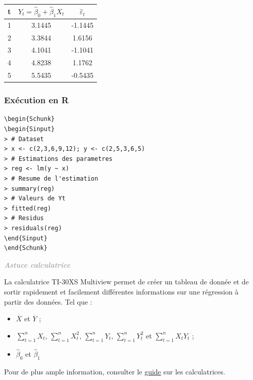 \documentclass[11pt,french]{report}
\newenvironment{moreInfo}[1]
	{\begin{mdframed}
	\textcolor{darkgray}{\huge \raisebox{-3.5pt}{\faInfo} 
	\hspace{0.5cm} \large\bfseries #1}\\[5pt]
	\normalsize
	\makebox[0.1\textwidth][l]{}	
	\begin{minipage}{10cm}}
	{	\end{minipage}
	\end{mdframed}}
\begin{document}
\begin{center}
\begin{tabular}{|c|c|c|}
\hline
t & $Y_t = \hat{\beta}_0 + \hat{\beta}_1X_t$ & $\hat{\varepsilon}_t$ \\
\hline
1 & 3.1445 & -1.1445 \\
2 & 3.3844 & 1.6156 \\
3 & 4.1041 & -1.1041 \\
4 & 4.8238 & 1.1762 \\
5 & 5.5435 & -0.5435 \\
\hline
\end{tabular}
\end{center}

\begin{center}
\end{center}

\bigskip
\subsubsection*{Exécution en R}
\begin{lstlisting}[linerange=\\begin\{Sinput\}-\\end\{Sinput\},includerangemarker=false, caption = Code source en R pour l'exemple]
\begin{Schunk}
\begin{Sinput}
> # Dataset
> x <- c(2,3,6,9,12); y <- c(2,5,3,6,5)
> # Estimations des parametres
> reg <- lm(y ~ x)
> # Resume de l'estimation
> summary(reg)
> # Valeurs de Yt
> fitted(reg)
> # Residus 
> residuals(reg)
\end{Sinput}
\end{Schunk}
\end{lstlisting}

\bigskip
\begin{moreInfo}{\emph{Astuce calculatrice}}
	La calculatrice TI-30XS Multiview permet de créer un tableau de donnée et de sortir rapidement et facilement différentes informations sur une régression à partir des données. Tel que :
	\begin{itemize}
	\item $\overline{X}$ et $\overline{Y}$ ;
	\item $\sum_{t=1}^n X_t$, $\sum_{t=1}^n X_t^2$, $\sum_{t=1}^n Y_t$, $\sum_{t=1}^n Y_t^2$ et $\sum_{t=1}^n X_tY_t$ ;
	\item $\hat{\beta}_0$ et $\hat{\beta}_1$
	\end{itemize}
	Pour de plus ample information, consulter le \href{https://github.com/alpa12/guide_calculatrice}{guide} sur les calculatrices.
\end{moreInfo}
\bigskip
\end{document}

